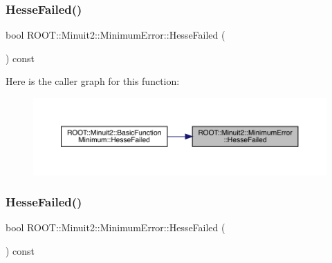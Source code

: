 \mbox{\label{classROOT_1_1Minuit2_1_1MinimumError_adf8acb6ea4137162b034eb6b9a79d9b9}} 
\subsubsection{\texorpdfstring{HesseFailed()}{HesseFailed()}\hspace{0.1cm}{\footnotesize\ttfamily [1/2]}}
{\footnotesize\ttfamily bool R\+O\+O\+T\+::\+Minuit2\+::\+Minimum\+Error\+::\+Hesse\+Failed (\begin{DoxyParamCaption}{ }\end{DoxyParamCaption}) const\hspace{0.3cm}{\ttfamily [inline]}}

Here is the caller graph for this function\+:\nopagebreak
\begin{figure}[H]
\begin{center}
\leavevmode
\includegraphics[width=350pt]{d5/d32/classROOT_1_1Minuit2_1_1MinimumError_adf8acb6ea4137162b034eb6b9a79d9b9_icgraph}
\end{center}
\end{figure}
\mbox{\label{classROOT_1_1Minuit2_1_1MinimumError_adf8acb6ea4137162b034eb6b9a79d9b9}} 
\subsubsection{\texorpdfstring{HesseFailed()}{HesseFailed()}\hspace{0.1cm}{\footnotesize\ttfamily [2/2]}}
{\footnotesize\ttfamily bool R\+O\+O\+T\+::\+Minuit2\+::\+Minimum\+Error\+::\+Hesse\+Failed (\begin{DoxyParamCaption}{ }\end{DoxyParamCaption}) const\hspace{0.3cm}{\ttfamily [inline]}}

